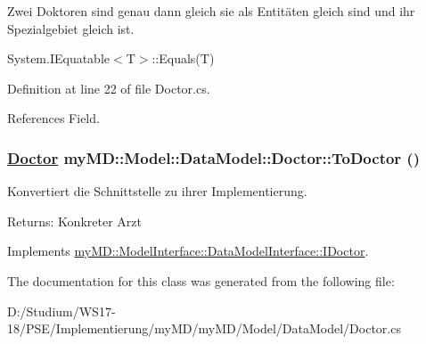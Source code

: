 Zwei Doktoren sind genau dann gleich sie als Entit\"{a}ten gleich sind und ihr Spezialgebiet gleich ist. 

System.IEquatable$<$T$>$::Equals(T) 

Definition at line 22 of file Doctor.cs.

References Field.\hypertarget{classmy_m_d_1_1_model_1_1_data_model_1_1_doctor_603e176dcbd8ab965588d1e0cb671f64}{
\subsubsection[ToDoctor]{\setlength{\rightskip}{0pt plus 5cm}\hyperlink{classmy_m_d_1_1_model_1_1_data_model_1_1_doctor}{Doctor} my\-MD::Model::Data\-Model::Doctor::To\-Doctor ()}}
\label{db/d24/classmy_m_d_1_1_model_1_1_data_model_1_1_doctor_603e176dcbd8ab965588d1e0cb671f64}


Konvertiert die Schnittstelle zu ihrer Implementierung. 

\begin{Desc}
\item[Returns:]Konkreter Arzt\end{Desc}


Implements \hyperlink{interfacemy_m_d_1_1_model_interface_1_1_data_model_interface_1_1_i_doctor_603e176dcbd8ab965588d1e0cb671f64}{my\-MD::Model\-Interface::Data\-Model\-Interface::IDoctor}.

The documentation for this class was generated from the following file:\begin{CompactItemize}
\item 
D:/Studium/WS17-18/PSE/Implementierung/my\-MD/my\-MD/Model/Data\-Model/Doctor.cs\end{CompactItemize}
